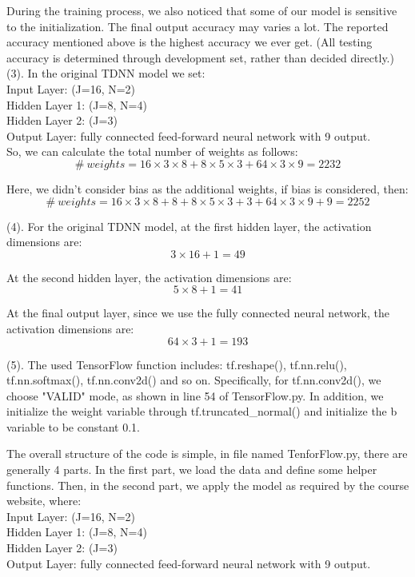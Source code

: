  During the training process, we also noticed that some of our model is sensitive to the initialization. The final output accuracy may varies a lot. The reported accuracy mentioned above is the highest accuracy we ever get. (All testing accuracy is determined through development set, rather than decided directly.)\\

(3). In the original TDNN model we set:\\
\indent Input Layer: (J=16, N=2)\\
\indent Hidden Layer 1: (J=8, N=4)\\
\indent Hidden Layer 2: (J=3)\\
\indent Output Layer: fully connected feed-forward neural network with 9 output.\\
So, we can calculate the total number of weights as follows:
$$ \# \  weights = 16 \times 3 \times 8 + 8 \times 5 \times 3 + 64 \times 3 \times 9 = 2232 $$

 Here, we didn't consider bias as the additional weights, if bias is considered, then:
$$ \# \  weights = 16 \times 3 \times 8 + 8 + 8 \times 5 \times 3 + 3 + 64 \times 3 \times 9 + 9 = 2252 $$

(4). For the original TDNN model, at the first hidden layer, the activation dimensions are:
$$ 3 \times 16 + 1 = 49 $$

At the second hidden layer, the activation dimensions are:
$$ 5 \times 8 + 1 = 41 $$

At the final output layer, since we use the fully connected neural network, the activation dimensions are:
$$ 64 \times 3 + 1 = 193 $$

(5). The used TensorFlow function includes: tf.reshape(), tf.nn.relu(), tf.nn.softmax(), tf.nn.conv2d() and so on. Specifically, for tf.nn.conv2d(), we choose "VALID" mode, as shown in line 54 of TensorFlow.py. In addition, we initialize the weight variable through tf.truncated{\_}normal() and initialize the b variable to be constant 0.1.

The overall structure of the code is simple, in file named TenforFlow.py, there are generally 4 parts. In the first part, we load the data and define some helper functions. Then, in the second part, we apply the model as required by the course website, where: \\
\indent Input Layer: (J=16, N=2)\\
\indent Hidden Layer 1: (J=8, N=4)\\
\indent Hidden Layer 2: (J=3)\\
\indent Output Layer: fully connected feed-forward neural network with 9 output.\\

